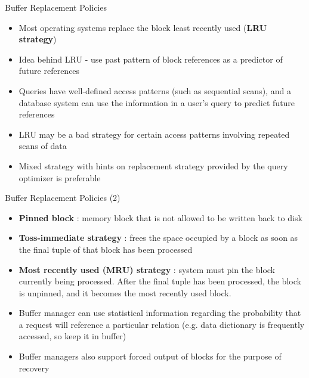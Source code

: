 \documentclass[aspectratio=169, xcolor=dvipsnames]{beamer}
\begin{document}
\begin{frame}{Buffer Replacement Policies}
    \begin{block}{}
        \begin{itemize}
            \item Most operating systems replace the block least recently used (\textbf{LRU strategy})
            \item Idea behind LRU - use past pattern of block references as a predictor of future references
            \item Queries have well-defined access patterns (such as sequential scans), and a database system can use the information in a user's query to predict future references
            \item LRU may be a bad strategy for certain access patterns involving repeated scans of data
            \item Mixed strategy with hints on replacement strategy provided by the query optimizer is preferable
        \end{itemize}
    \end{block}
\end{frame}

\begin{frame}{Buffer Replacement Policies (2)}
    \begin{block}{}
        \begin{itemize}
            \item \textbf{Pinned block} : memory block that is not allowed to be written back to disk
            \item \textbf{Toss-immediate strategy} : frees the space occupied by a block as soon as the final tuple of that block has been processed
            \item \textbf{Most recently used (MRU) strategy} : system must pin the block currently being processed. After the final tuple has been processed, the block is unpinned, and it becomes the most recently used block.
            \item Buffer manager can use statistical information regarding the probability that a request will reference a particular relation (e.g. data dictionary is frequently accessed, so keep it in buffer)
            \item Buffer managers also support forced output of blocks for the purpose of recovery
        \end{itemize}
    \end{block}
\end{frame}
\end{document}
